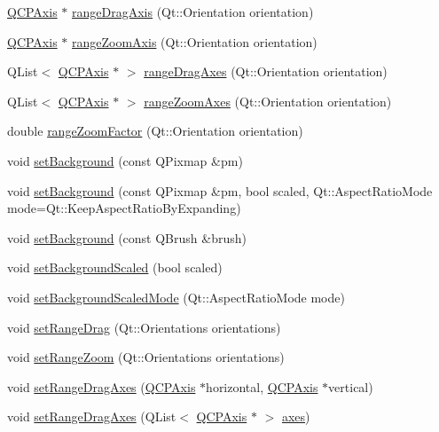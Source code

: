 \begin{DoxyCompactItemize}
\item 
\hyperlink{classQCPAxis}{Q\+C\+P\+Axis} $\ast$ \hyperlink{classQCPAxisRect_a6d7c22cfc54fac7a3d6ef80b133a8574}{range\+Drag\+Axis} (Qt\+::\+Orientation orientation)
\item 
\hyperlink{classQCPAxis}{Q\+C\+P\+Axis} $\ast$ \hyperlink{classQCPAxisRect_a679c63f2b8daccfe6ec5110dce3dd3b6}{range\+Zoom\+Axis} (Qt\+::\+Orientation orientation)
\item 
Q\+List$<$ \hyperlink{classQCPAxis}{Q\+C\+P\+Axis} $\ast$ $>$ \hyperlink{classQCPAxisRect_aae5f99a044ca911685a306f01b7ff941}{range\+Drag\+Axes} (Qt\+::\+Orientation orientation)
\item 
Q\+List$<$ \hyperlink{classQCPAxis}{Q\+C\+P\+Axis} $\ast$ $>$ \hyperlink{classQCPAxisRect_a86aac0f435f209d60dacd22cda10c104}{range\+Zoom\+Axes} (Qt\+::\+Orientation orientation)
\item 
double \hyperlink{classQCPAxisRect_ae4e6c4d143aacc88d2d3c56f117c2fe1}{range\+Zoom\+Factor} (Qt\+::\+Orientation orientation)
\item 
void \hyperlink{classQCPAxisRect_af615ab5e52b8e0a9a0eff415b6559db5}{set\+Background} (const Q\+Pixmap \&pm)
\item 
void \hyperlink{classQCPAxisRect_ac48a2d5d9b7732e73b86605c69c5e4c1}{set\+Background} (const Q\+Pixmap \&pm, bool scaled, Qt\+::\+Aspect\+Ratio\+Mode mode=Qt\+::\+Keep\+Aspect\+Ratio\+By\+Expanding)
\item 
void \hyperlink{classQCPAxisRect_a22a22b8668735438dc06f9a55fe46b33}{set\+Background} (const Q\+Brush \&brush)
\item 
void \hyperlink{classQCPAxisRect_ae6d36c3e0e968ffb991170a018e7b503}{set\+Background\+Scaled} (bool scaled)
\item 
void \hyperlink{classQCPAxisRect_a5ef77ea829c9de7ba248e473f48f7305}{set\+Background\+Scaled\+Mode} (Qt\+::\+Aspect\+Ratio\+Mode mode)
\item 
void \hyperlink{classQCPAxisRect_ae6aef2f7211ba6097c925dcd26008418}{set\+Range\+Drag} (Qt\+::\+Orientations orientations)
\item 
void \hyperlink{classQCPAxisRect_a7960a9d222f1c31d558b064b60f86a31}{set\+Range\+Zoom} (Qt\+::\+Orientations orientations)
\item 
void \hyperlink{classQCPAxisRect_a648cce336bd99daac4a5ca3e5743775d}{set\+Range\+Drag\+Axes} (\hyperlink{classQCPAxis}{Q\+C\+P\+Axis} $\ast$horizontal, \hyperlink{classQCPAxis}{Q\+C\+P\+Axis} $\ast$vertical)
\item 
void \hyperlink{classQCPAxisRect_af0fbc510147a2a54b9c8cd296e6df8ac}{set\+Range\+Drag\+Axes} (Q\+List$<$ \hyperlink{classQCPAxis}{Q\+C\+P\+Axis} $\ast$ $>$ \hyperlink{classQCPAxisRect_a66654d51ca611ef036ded36250cd2518}{axes})

\end{DoxyCompactItemize}
